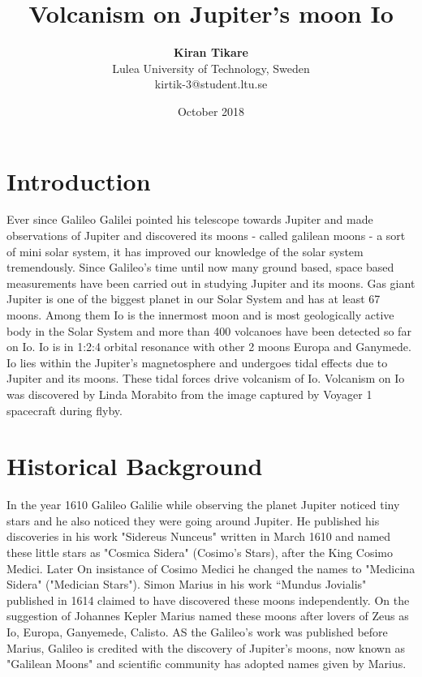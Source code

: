 \documentclass[a4paper,11pt,oneside]{article}
\title{\textbf{Volcanism on Jupiter's moon Io}}
\author{\textbf{Kiran Tikare} \\ Lulea University of Technology, Sweden \\ {kirtik-3@student.ltu.se}}
\date{October 2018}
\begin{document}
\maketitle 

\newpage
\tableofcontents
\newpage
\thispagestyle{empty}
 
\listoffigures
 
\listoftables
\newpage

\section{Introduction}
Ever since Galileo Galilei pointed his telescope towards Jupiter and made observations of Jupiter and discovered its moons - called galilean moons - a sort of mini solar system, it has improved our knowledge of the solar system tremendously. Since Galileo's time until now many ground based, space based measurements have been carried out in studying Jupiter and its moons. Gas giant Jupiter is one of the biggest planet in our Solar System and has at least 67 moons. Among them Io is the innermost moon and is most geologically active body in the Solar System and more than 400 volcanoes have been detected so far on Io. Io is in 1:2:4 orbital resonance with other 2 moons Europa and Ganymede. Io lies within the Jupiter's magnetosphere and undergoes tidal effects due to Jupiter and its moons. These tidal forces drive volcanism of Io. Volcanism on Io was discovered by Linda Morabito from the image captured by Voyager 1 spacecraft during flyby.

\section{Historical Background}
In the year 1610 Galileo Galilie while observing the planet Jupiter noticed tiny stars and he also noticed they were going around Jupiter. He published his discoveries in his work "Sidereus Nunceus" written in March 1610 and named these little stars as "Cosmica Sidera" (Cosimo's Stars), after the King Cosimo Medici. Later On insistance of Cosimo Medici he changed the names to "Medicina Sidera" ("Medician Stars"). Simon Marius in his work “Mundus Jovialis" published in 1614 claimed to have discovered these moons independently. On the suggestion of Johannes Kepler Marius named these moons after lovers of Zeus as Io, Europa, Ganyemede, Calisto. AS the Galileo's work was published before Marius, Galileo is credited with the discovery of Jupiter's moons, now known as "Galilean Moons" and scientific community has adopted names given by Marius.
\end{document}
